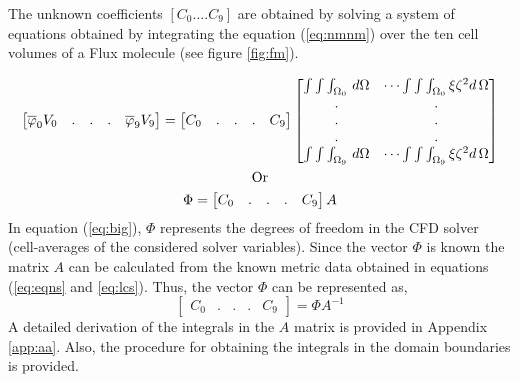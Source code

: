 The unknown coefficients $[C_0....C_9]$ are obtained by solving a system of equations obtained by integrating the equation (\ref{eq:nmnm}) over the ten cell volumes of a Flux molecule (see figure \ref{fig:fm}).

\begin{equation}
\label{eq:big}
\begin{gathered}
    \begin{bmatrix}
    \overline{\varphi}_0 V_0 &.&.&.&
    \overline{\varphi}_9 V_9 
    \end{bmatrix}=\begin{bmatrix}
    C_0 &.&.&.&
    C_9
    \end{bmatrix}\begin{bmatrix}
    \int\int\int_{\Omega_0}\,d\Omega& \cdots \int\int\int_{\Omega_0} \xi\zeta^2 d\,\Omega \\
    .   &                                                                        .\\
    .    &                                                                        .\\
    .     &                                                                          .\\
    \int\int\int_{\Omega_9}\,d\Omega& \cdots \int\int\int_{\Omega_9} \xi\zeta^2 d\,\Omega \\
    \end{bmatrix}\\
    $Or$\\
    {\Phi}=\begin{bmatrix}
    C_0 &.&.&.&
    C_9
    \end{bmatrix} A
    \end{gathered}
\end{equation}
In equation (\ref{eq:big}), $\Phi$ represents the degrees of freedom in the CFD solver (cell-averages of the considered solver variables). Since the vector $\Phi$ is known the matrix $A$ can be calculated from the known metric data obtained in equations (\ref{eq:eqns} and \ref{eq:lcs}). Thus, the vector $\Phi$ can be represented as,
\begin{equation}
    \begin{bmatrix}
    C_0&.&.&.&C_9
    \end{bmatrix}=\Phi A^{-1}
\end{equation}
A detailed derivation of the integrals in the $A$ matrix is provided in Appendix \ref{app:aa}. Also, the procedure for obtaining the integrals in the domain boundaries is provided.

